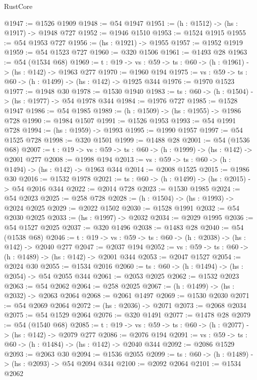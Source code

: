 \begin{lexlean}{RustCore}
\begin{coremodule}
@1947 := @1526 @1909
@1948 := @54 @1947
@1951 := (h : @1512) -> (hs : @1917) -> @1948 @727
@1952 := @1946 @1510
@1953 := @1524 @1915
@1955 := @54 @1953 @727
@1956 := (hs : @1921) -> @1955
@1957 := @1952 @1919
@1959 := @54 @1523 @727
@1960 := @320 @1506
@1961 := @1493 @28
@1963 := @54 (@1534 @68)
@1969 := {t : @19} -> {vs : @59} -> {ts : @60} -> (h : @1961) -> (hs : @142) -> @1963 @277
@1970 := @1960 @194
@1975 := {vs : @59} -> {ts : @60} -> (h : @1499) -> (hs : @142) -> @1925 @344
@1976 := @1970 @1523
@1977 := @1948 @30
@1978 := @1530 @1940
@1983 := {ts : @60} -> (h : @1504) -> (hs : @1977) -> @54 @1978 @344
@1984 := @1976 @727
@1985 := @1528 @1947
@1986 := @54 @1985
@1989 := (h : @1509) -> (hs : @1955) -> @1986 @728
@1990 := @1984 @1507
@1991 := @1526 @1953
@1993 := @54 @1991 @728
@1994 := (hs : @1959) -> @1993
@1995 := @1990 @1957
@1997 := @54 @1525 @728
@1998 := @320 @1501
@1999 := @1488 @28
@2001 := @54 (@1536 @68)
@2007 := {t : @19} -> {vs : @59} -> {ts : @60} -> (h : @1999) -> (hs : @142) -> @2001 @277
@2008 := @1998 @194
@2013 := {vs : @59} -> {ts : @60} -> (h : @1494) -> (hs : @142) -> @1963 @344
@2014 := @2008 @1525
@2015 := @1986 @30
@2016 := @1532 @1978
@2021 := {ts : @60} -> (h : @1499) -> (hs : @2015) -> @54 @2016 @344
@2022 := @2014 @728
@2023 := @1530 @1985
@2024 := @54 @2023
@2025 := @258 @728
@2028 := (h : @1504) -> (hs : @1993) -> @2024 @2025
@2029 := @2022 @1502
@2030 := @1528 @1991
@2032 := @54 @2030 @2025
@2033 := (hs : @1997) -> @2032
@2034 := @2029 @1995
@2036 := @54 @1527 @2025
@2037 := @320 @1496
@2038 := @1483 @28
@2040 := @54 (@1538 @68)
@2046 := {t : @19} -> {vs : @59} -> {ts : @60} -> (h : @2038) -> (hs : @142) -> @2040 @277
@2047 := @2037 @194
@2052 := {vs : @59} -> {ts : @60} -> (h : @1489) -> (hs : @142) -> @2001 @344
@2053 := @2047 @1527
@2054 := @2024 @30
@2055 := @1534 @2016
@2060 := {ts : @60} -> (h : @1494) -> (hs : @2054) -> @54 @2055 @344
@2061 := @2053 @2025
@2062 := @1532 @2023
@2063 := @54 @2062
@2064 := @258 @2025
@2067 := (h : @1499) -> (hs : @2032) -> @2063 @2064
@2068 := @2061 @1497
@2069 := @1530 @2030
@2071 := @54 @2069 @2064
@2072 := (hs : @2036) -> @2071
@2073 := @2068 @2034
@2075 := @54 @1529 @2064
@2076 := @320 @1491
@2077 := @1478 @28
@2079 := @54 (@1540 @68)
@2085 := {t : @19} -> {vs : @59} -> {ts : @60} -> (h : @2077) -> (hs : @142) -> @2079 @277
@2086 := @2076 @194
@2091 := {vs : @59} -> {ts : @60} -> (h : @1484) -> (hs : @142) -> @2040 @344
@2092 := @2086 @1529
@2093 := @2063 @30
@2094 := @1536 @2055
@2099 := {ts : @60} -> (h : @1489) -> (hs : @2093) -> @54 @2094 @344
@2100 := @2092 @2064
@2101 := @1534 @2062

\end{coremodule}
\end{lexlean}

